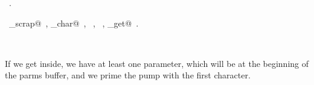 \documentclass{report}
\begin{document}
\begin{flushleft}
\begin{minipage}{\linewidth}
\begin{list}{}{}
\mbox{}\verb@  }@\\
\mbox{}\verb@  if (c != '>') {@\\
\mbox{}\verb@    /* ZZZ print error */;@\\
\mbox{}\verb@  }@\\
\mbox{}\verb@}@{\NWsep}
\end{list}
\vspace{-1ex}
\footnotesize\addtolength{\baselineskip}{-1ex}
\begin{list}{}{\setlength{\itemsep}{-\parsep}\setlength{\itemindent}{-\leftmargin}}
\item \NWtxtMacroRefIn\ .
\end{list}
\vspace{-2ex}
\footnotesize\addtolength{\baselineskip}{-1ex}
\begin{list}{}{\setlength{\itemsep}{-\parsep}\setlength{\itemindent}{-\leftmargin}}
\item \NWtxtIdentsUsed\nobreak\  \verb@collect_scrap@\nobreak\ , \verb@nw_char@\nobreak\ , \verb@push@\nobreak\ , \verb@pushs@\nobreak\ , \verb@source_get@\nobreak\ .\end{list}
\end{minipage}\\[4ex]
\end{flushleft}
If we get inside, we have at least one parameter, which will be at
the beginning of the parms buffer, and we prime the pump with the
first character.
\end{document}

